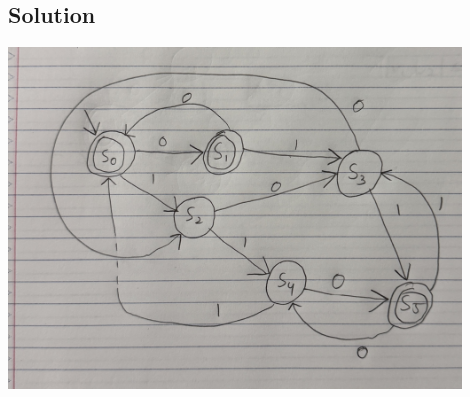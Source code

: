 \documentclass[12pt]{article}
\begin{document}
\subsection*{Solution}


\begin{center}
\includegraphics[width=0.9\textwidth]{problem4_diagram.png}
\end{center}
\end{document}

